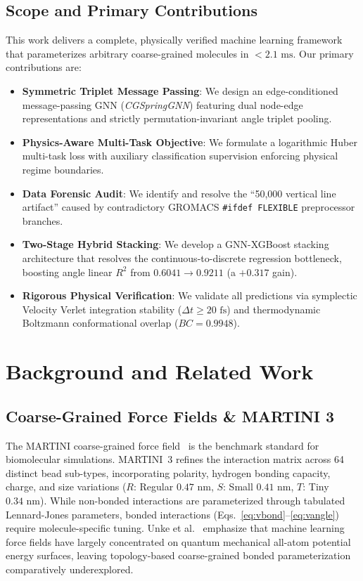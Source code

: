 \documentclass[11pt,a4paper]{article}
\begin{document}
\subsection{Scope and Primary Contributions}
This work delivers a complete, physically verified machine learning framework that parameterizes arbitrary coarse-grained molecules in $< 2.1\text{ ms}$. Our primary contributions are:
\begin{itemize}
    \item \textbf{Symmetric Triplet Message Passing}: We design an edge-conditioned message-passing GNN (\textit{CGSpringGNN}) featuring dual node-edge representations and strictly permutation-invariant angle triplet pooling.
    \item \textbf{Physics-Aware Multi-Task Objective}: We formulate a logarithmic Huber multi-task loss with auxiliary classification supervision enforcing physical regime boundaries.
    \item \textbf{Data Forensic Audit}: We identify and resolve the ``50,000 vertical line artifact'' caused by contradictory GROMACS \texttt{\#ifdef FLEXIBLE} preprocessor branches.
    \item \textbf{Two-Stage Hybrid Stacking}: We develop a GNN-XGBoost stacking architecture that resolves the continuous-to-discrete regression bottleneck, boosting angle linear $R^2$ from $0.6041 \to \mathbf{0.9211}$ (a $+0.317$ gain).
    \item \textbf{Rigorous Physical Verification}: We validate all predictions via symplectic Velocity Verlet integration stability ($\Delta t \ge 20\text{ fs}$) and thermodynamic Boltzmann conformational overlap ($BC = 0.9948$).
\end{itemize}

\section{Background and Related Work}
\label{sec:background}

\subsection{Coarse-Grained Force Fields \& MARTINI 3}
The MARTINI coarse-grained force field~\cite{marrink2007martini,souza2021martini3} is the benchmark standard for biomolecular simulations. MARTINI~3 refines the interaction matrix across 64 distinct bead sub-types, incorporating polarity, hydrogen bonding capacity, charge, and size variations ($R$: Regular $0.47\text{ nm}$, $S$: Small $0.41\text{ nm}$, $T$: Tiny $0.34\text{ nm}$). While non-bonded interactions are parameterized through tabulated Lennard-Jones parameters, bonded interactions (Eqs.~\ref{eq:vbond}--\ref{eq:vangle}) require molecule-specific tuning. Unke et al.~\cite{unke2021machine} emphasize that machine learning force fields have largely concentrated on quantum mechanical all-atom potential energy surfaces, leaving topology-based coarse-grained bonded parameterization comparatively underexplored.
\end{document}
